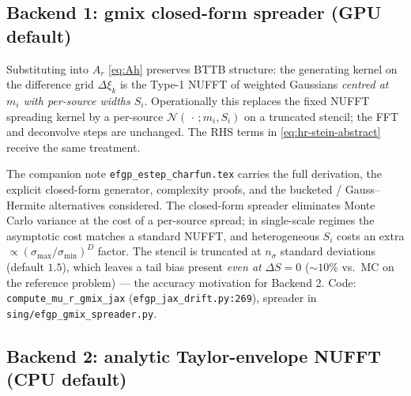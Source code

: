 \documentclass[11pt]{article}
\newcommand{\code}[1]{\texttt{\small #1}}
\begin{document}
\subsection{Backend 1: gmix closed-form spreader (GPU default)}
\label{sec:gmix}

Substituting
into $A_r$ \eqref{eq:Ah} preserves BTTB structure: the generating kernel
on the difference grid $\Delta\xi_k$ is the Type-1 NUFFT of weighted
Gaussians \emph{centred at $m_i$ with per-source widths $S_i$}.
Operationally this replaces the fixed NUFFT spreading kernel by a
per-source $\mathcal{N}(\,\cdot\,;m_i,S_i)$ on a truncated stencil;
the FFT and deconvolve steps are unchanged. The RHS terms in
\eqref{eq:hr-stein-abstract} receive the same treatment.

The companion note \texttt{efgp\_estep\_charfun.tex} carries the full
derivation, the explicit closed-form generator, complexity proofs, and
the bucketed / Gauss--Hermite alternatives considered. The closed-form
spreader eliminates Monte Carlo variance at the cost of a per-source
spread; in single-scale regimes the asymptotic cost matches a standard
NUFFT, and heterogeneous $S_i$ costs an extra
$\propto(\sigma_{\max}/\sigma_{\min})^{D}$ factor. The stencil is
truncated at $n_\sigma$ standard deviations (default $1.5$), which leaves
a tail bias present \emph{even at} $\Delta S=0$ (${\sim}10\%$ vs.\ MC on
the reference problem) --- the accuracy motivation for Backend 2.
Code: \code{compute\_mu\_r\_gmix\_jax}
(\code{efgp\_jax\_drift.py:269}), spreader in
\code{sing/efgp\_gmix\_spreader.py}.

\subsection{Backend 2: analytic Taylor-envelope NUFFT (CPU default)}
\label{sec:analytic}
\end{document}
